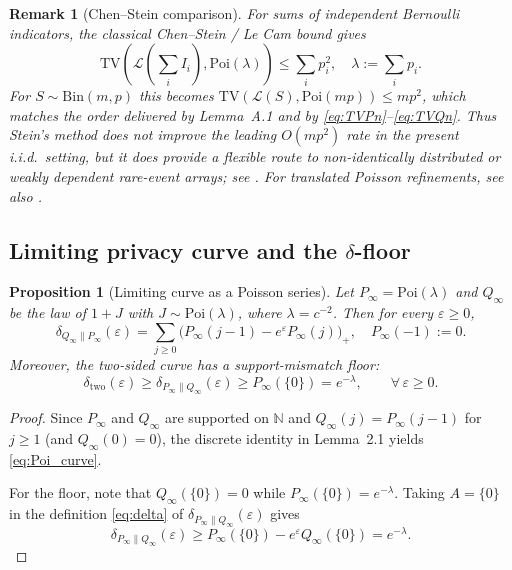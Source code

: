 \documentclass{article}
\newtheorem{proposition}[theorem]{Proposition}
\newtheorem{remark}[theorem]{Remark}
\begin{document}
\begin{remark}[Chen--Stein comparison]
For sums of independent Bernoulli indicators, the classical Chen--Stein / Le Cam bound gives
\[
\mathrm{TV}\!\left(\mathcal{L}\!\left(\sum_i I_i\right), \mathrm{Poi}(\lambda)\right) \leq \sum_i p_i^2, \quad \lambda := \sum_i p_i.
\]
For $S \sim \mathrm{Bin}(m, p)$ this becomes $\mathrm{TV}(\mathcal{L}(S), \mathrm{Poi}(mp)) \leq mp^2$, which matches the order delivered by
Lemma~A.1 and by \eqref{eq:TVPn}--\eqref{eq:TVQn}. Thus Stein's method does not improve the leading $O(mp^2)$ rate in
the present i.i.d.\ setting, but it does provide a flexible route to non-identically distributed or weakly
dependent rare-event arrays; see \cite{BHJ92, CGS11}. For translated Poisson refinements, see also \cite{Rol07}.
\end{remark}

\subsection{Limiting privacy curve and the \texorpdfstring{$\delta$}{delta}-floor}

\begin{proposition}[Limiting curve as a Poisson series]
\label{prop:poisson-curve}
Let $P_\infty = \mathrm{Poi}(\lambda)$ and $Q_\infty$ be the law of $1 + J$ with $J \sim \mathrm{Poi}(\lambda)$, where $\lambda = c^{-2}$.
Then for every $\varepsilon \geq 0$,
\begin{equation}
\delta_{Q_\infty\|P_\infty}(\varepsilon) = \sum_{j \geq 0} \bigl(P_\infty(j-1) - e^\varepsilon P_\infty(j)\bigr)_+, \quad P_\infty(-1) := 0. \label{eq:Poi_curve}
\end{equation}
Moreover, the two-sided curve has a support-mismatch floor:
\begin{equation}
\delta_{\mathrm{two}}(\varepsilon) \geq \delta_{P_\infty\|Q_\infty}(\varepsilon) \geq P_\infty(\{0\}) = e^{-\lambda}, \qquad \forall\, \varepsilon \geq 0. \label{eq:floor}
\end{equation}
\end{proposition}

\begin{proof}
Since $P_\infty$ and $Q_\infty$ are supported on $\mathbb{N}$ and $Q_\infty(j) = P_\infty(j-1)$ for $j \geq 1$ (and $Q_\infty(0) = 0$),
the discrete identity in Lemma~2.1 yields \eqref{eq:Poi_curve}.

For the floor, note that $Q_\infty(\{0\}) = 0$ while $P_\infty(\{0\}) = e^{-\lambda}$. Taking $A = \{0\}$ in the definition \eqref{eq:delta}
of $\delta_{P_\infty\|Q_\infty}(\varepsilon)$ gives
\[
\delta_{P_\infty\|Q_\infty}(\varepsilon) \geq P_\infty(\{0\}) - e^\varepsilon Q_\infty(\{0\}) = e^{-\lambda}.
\]
\end{proof}
\end{document}
